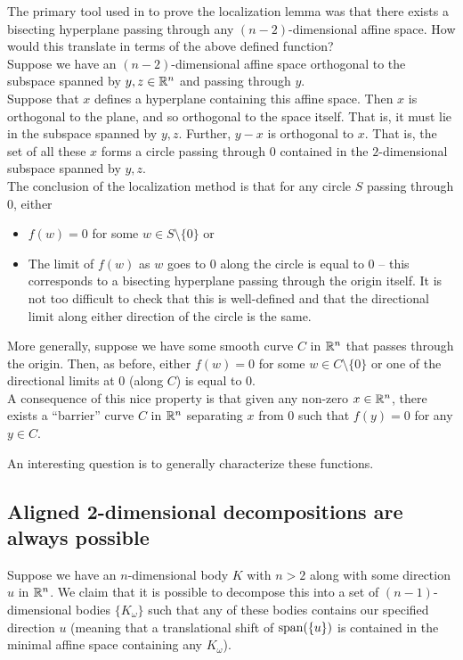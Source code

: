 \documentclass{article}
\begin{document}
		The primary tool used in \cite{lov-sim-on7} to prove the localization lemma was that there exists a bisecting hyperplane passing through any $(n-2)$-dimensional affine space. How would this translate in terms of the above defined function?\\
		Suppose we have an $(n-2)$-dimensional affine space orthogonal to the subspace spanned by $y,z\in\mathbb{R}^n$ and passing through $y$.\\
		Suppose that $x$ defines a hyperplane containing this affine space. Then $x$ is orthogonal to the plane, and so orthogonal to the space itself. That is, it must lie in the subspace spanned by $y, z$. Further, $y-x$ is orthogonal to $x$. That is, the set of all these $x$ forms a circle passing through $0$ contained in the $2$-dimensional subspace spanned by $y,z$.\\
		The conclusion of the localization method is that for any circle $S$ passing through $0$, either
		\begin{itemize}
			\item $f(w) = 0$ for some $w \in S \setminus \{0\}$ or
			\item The limit of $f(w)$ as $w$ goes to $0$ along the circle is equal to $0$ -- this corresponds to a bisecting hyperplane passing through the origin itself. It is not too difficult to check that this is well-defined and that the directional limit along either direction of the circle is the same. 
		\end{itemize}

		More generally, suppose we have some smooth curve $C$ in $\mathbb{R}^n$ that passes through the origin. Then, as before, either $f(w) = 0$ for some $w \in C \setminus \{0\}$ or one of the directional limits at $0$ (along $C$) is equal to $0$.\\

		A consequence of this nice property is that given any non-zero $x \in \mathbb{R}^n$, there exists a ``barrier'' curve $C$ in $\mathbb{R}^n$ separating $x$ from $0$ such that $f(y) = 0$ for any $y \in C$.

		An interesting question is to generally characterize these functions.

	\subsection{Aligned 2-dimensional decompositions are always possible}

		Suppose we have an $n$-dimensional body $K$ with $n>2$ along with some direction $u$ in $\mathbb{R}^n$. We claim that it is possible to decompose this into a set of $(n-1)$-dimensional bodies $\{K_\omega\}$ such that any of these bodies contains our specified direction $u$ (meaning that a translational shift of $\operatorname{span}(\{u\})$ is contained in the minimal affine space containing any $K_\omega$).\\
\end{document}
